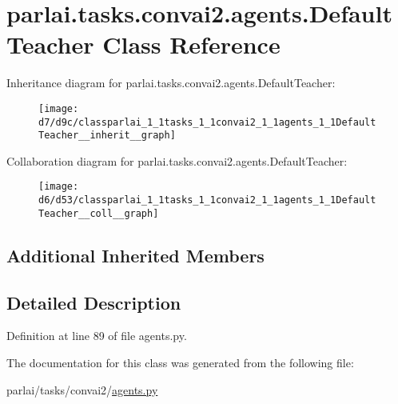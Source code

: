 \hypertarget{classparlai_1_1tasks_1_1convai2_1_1agents_1_1DefaultTeacher}{}\section{parlai.\+tasks.\+convai2.\+agents.\+Default\+Teacher Class Reference}
\label{classparlai_1_1tasks_1_1convai2_1_1agents_1_1DefaultTeacher}


Inheritance diagram for parlai.\+tasks.\+convai2.\+agents.\+Default\+Teacher\+:
\nopagebreak
\begin{figure}[H]
\begin{center}
\leavevmode
\texttt{[image: d7/d9c/classparlai\_1\_1tasks\_1\_1convai2\_1\_1agents\_1\_1DefaultTeacher\_\_inherit\_\_graph]}
\end{center}
\end{figure}


Collaboration diagram for parlai.\+tasks.\+convai2.\+agents.\+Default\+Teacher\+:
\nopagebreak
\begin{figure}[H]
\begin{center}
\leavevmode
\texttt{[image: d6/d53/classparlai\_1\_1tasks\_1\_1convai2\_1\_1agents\_1\_1DefaultTeacher\_\_coll\_\_graph]}
\end{center}
\end{figure}
\subsection*{Additional Inherited Members}


\subsection{Detailed Description}


Definition at line 89 of file agents.\+py.



The documentation for this class was generated from the following file\+:\begin{DoxyCompactItemize}
\item 
parlai/tasks/convai2/\hyperlink{parlai_2tasks_2convai2_2agents_8py}{agents.\+py}\end{DoxyCompactItemize}
